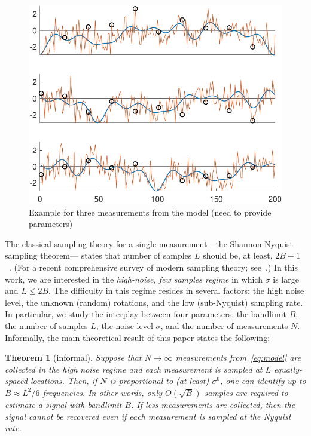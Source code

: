 \documentclass[english,12pt]{article}
\newcommand{\tB}{B}
\newtheorem{thm}{Theorem}
\numberwithin{equation}{section}
\numberwithin{thm}{section} %
\begin{document}
\begin{figure}
	\centering
	\includegraphics[scale=1.3]{fig_intro}
	\caption{Example for three measurements from the model (need to provide parameters)}
\end{figure}
The classical sampling theory for a single measurement---the Shannon-Nyquist sampling theorem--- states that number of samples $L$ should be, at least, $2\tB+1$~\cite{shannon1949communication}. (For a recent comprehensive survey of modern sampling theory; see~\cite{eldar2015sampling}.)
In this work, we are interested in  the \emph{high-noise, few samples regime}  in which $\sigma$ is large  and $L\leq 2\tB$. 
The difficulty in this regime resides in several factors: the high noise level, the unknown (random) rotations, and the low (sub-Nyquist) sampling rate.
In particular, we 
study the interplay between four parameters: the bandlimit $\tB$, the number of samples $L$, the noise level $\sigma$, and the number of measurements $N$. 
Informally, the main theoretical result of this paper states the following:
\begin{thm}[informal]
Suppose that $N\to\infty$ measurements from~\eqref{eq:model} are collected in the high noise regime and each measurement is sampled at $L$ equally-spaced locations. 
Then, if $N$ is proportional to  (at least) $\sigma^6$, one can identify up to $B\approx L^2/6$ frequencies. In other words, only $O(\sqrt{B})$ samples are required to  estimate a signal with bandlimit $B$.
 If less measurements are collected, then the signal cannot be recovered even if each measurement is sampled at the Nyquist rate.
\end{thm}
\end{document}
